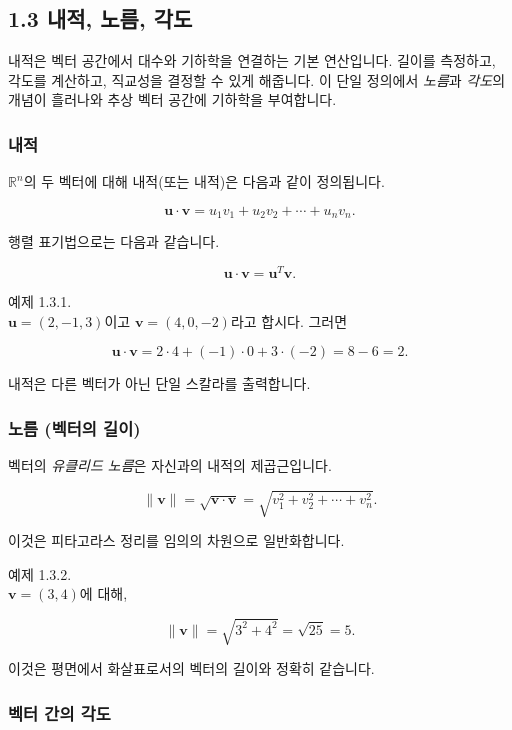 \documentclass[
  12pt,
  a4paper,
]{article}
\begin{document}
\subsection{1.3 내적, 노름, 각도}\label{13-dot-product-norms-and-angles}

내적은 벡터 공간에서 대수와 기하학을 연결하는 기본 연산입니다. 길이를 측정하고, 각도를 계산하고, 직교성을 결정할 수 있게 해줍니다. 이 단일 정의에서 \emph{노름}과 \emph{각도}의 개념이 흘러나와 추상 벡터 공간에 기하학을 부여합니다.

\subsubsection{내적}\label{the-dot-product}

\(\mathbb{R}^n\)의 두 벡터에 대해 내적(또는 내적)은 다음과 같이 정의됩니다.

\[\mathbf{u} \cdot \mathbf{v} = u_1 v_1 + u_2 v_2 + \cdots + u_n v_n.\]

행렬 표기법으로는 다음과 같습니다.

\[\mathbf{u} \cdot \mathbf{v} = \mathbf{u}^T \mathbf{v}.\]

예제 1.3.1.\\
\(\mathbf{u} = (2, -1, 3)\)이고 \(\mathbf{v} = (4, 0, -2)\)라고 합시다. 그러면

\[\mathbf{u} \cdot \mathbf{v} = 2\cdot 4 + (-1)\cdot 0 + 3\cdot (-2) = 8 - 6 = 2.\]

내적은 다른 벡터가 아닌 단일 스칼라를 출력합니다.

\subsubsection{노름 (벡터의 길이)}\label{norms-length-of-a-vector}

벡터의 \emph{유클리드 노름}은 자신과의 내적의 제곱근입니다.

\[\|\mathbf{v}\| = \sqrt{\mathbf{v} \cdot \mathbf{v}} = \sqrt{v_1^2 + v_2^2 + \cdots + v_n^2}.\]

이것은 피타고라스 정리를 임의의 차원으로 일반화합니다.

예제 1.3.2.\\
\(\mathbf{v} = (3, 4)\)에 대해,

\[\|\mathbf{v}\| = \sqrt{3^2 + 4^2} = \sqrt{25} = 5.\]

이것은 평면에서 화살표로서의 벡터의 길이와 정확히 같습니다.

\subsubsection{벡터 간의 각도}\label{angles-between-vectors}
\end{document}
